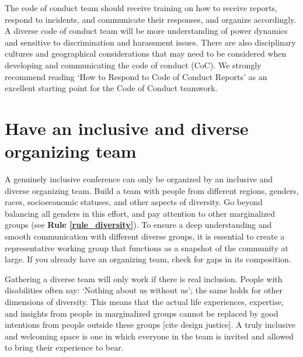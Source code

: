 \documentclass[10pt,letterpaper]{article}
\begin{document}
The code of conduct team should receive training on how to receive reports, respond to incidents, and communicate their responses, and organize accordingly. A diverse code of conduct team will be more understanding of power dynamics and sensitive to discrimination and harassment issues. There are also disciplinary cultures and geographical considerations that may need to be considered when developing and communicating the code of conduct (CoC). We strongly recommend reading `How to Respond to Code of Conduct Reports' \cite{auroraHowRespondCode2019} as an excellent starting point for the Code of Conduct teamwork.



\section{Have an inclusive and diverse organizing team}
\label{rule_organizing_team}

A genuinely inclusive conference can only be organized by an inclusive and diverse organizing team. Build a team with people from different regions, genders, races, socioeconomic statuses, and other aspects of diversity. 
Go beyond balancing all genders in this effort, and pay attention to other marginalized groups (see \textbf{Rule \ref{rule_diversity}}). To ensure a deep understanding and smooth communication with different diverse groups, it is essential to create a representative working group that functions as a snapshot of the community at large. If you already have an organizing team, check for gaps in its composition. 



Gathering a diverse team will only work if there is real inclusion. People with disabilities often say: `Nothing about us without us'; the same holds for other dimensions of diversity. This means that the actual life experiences, expertise, and insights from people in marginalized groups cannot be replaced by good intentions from people outside these groups [cite design justice]. A truly inclusive and welcoming space is one in which everyone in the team is invited and allowed to bring their experience to bear. 
\end{document}
